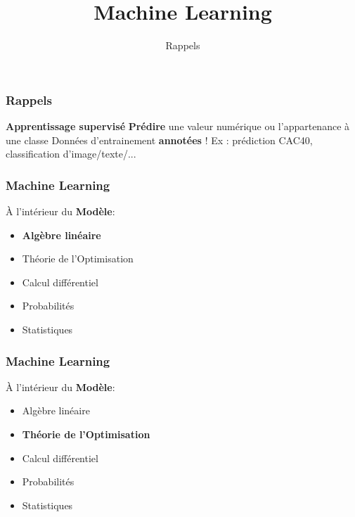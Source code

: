 \documentclass{formation}
\title{Machine Learning}
\subtitle{Rappels}
\begin{document}
\maketitle

\begin{frame}
  \frametitle{Rappels}
  \textbf{Apprentissage supervisé}
  \newline \newline
  \textbf{Prédire} une valeur numérique ou l'appartenance à une classe
  \newline
  Données d'entrainement \textbf{annotées} !
  \newline \newline
  Ex : prédiction CAC40, classification d'image/texte/...
\end{frame}

\begin{frame}
  \frametitle{Machine Learning}
  \begin{minipage}[c]{0.41\linewidth}
    À l'intérieur du \textbf{Modèle}:
    \begin{itemize}
    \item \textbf{Algèbre linéaire}
    \item Théorie de l'Optimisation
    \item Calcul différentiel
    \item Probabilités
    \item Statistiques
    \end{itemize}
  \end{minipage}\hfill
  \begin{minipage}[c]{0.58\linewidth}
  \end{minipage}\hfill
\end{frame}

\begin{frame}
  \frametitle{Machine Learning}
  \begin{minipage}[c]{0.45\linewidth}
    À l'intérieur du \textbf{Modèle}:
    \begin{itemize}
    \item Algèbre linéaire
    \item \textbf{Théorie de l'Optimisation}
    \item Calcul différentiel
    \item Probabilités
    \item Statistiques
    \end{itemize}
  \end{minipage}\hfill
  \begin{minipage}[c]{0.55\linewidth}
  \end{minipage}\hfill
\end{frame}
\end{document}
